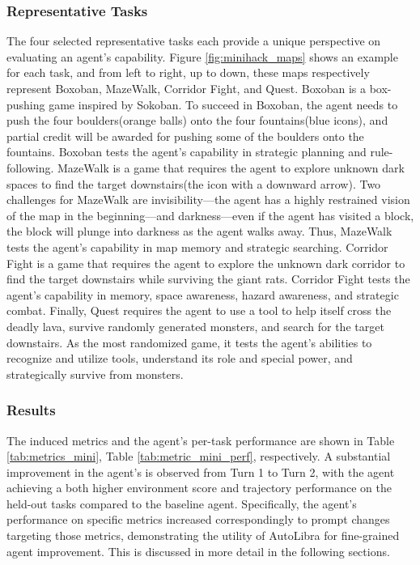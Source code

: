 \subsubsection{Representative Tasks}
The four selected representative tasks each provide a unique perspective on evaluating an agent's capability. Figure \ref{fig:minihack_maps} shows an example for each task, and from left to right, up to down, these maps respectively represent Boxoban, MazeWalk, Corridor Fight, and Quest. Boxoban is a box-pushing game inspired by Sokoban. To succeed in Boxoban, the agent needs to push the four boulders(orange balls) onto the four fountains(blue icons), and partial credit will be awarded for pushing some of the boulders onto the fountains. Boxoban tests the agent's capability in strategic planning and rule-following. MazeWalk is a game that requires the agent to explore unknown dark spaces to find the target downstairs(the icon with a downward arrow). Two challenges for MazeWalk are invisibility—the agent has a highly restrained vision of the map in the beginning—and darkness—even if the agent has visited a block, the block will plunge into darkness as the agent walks away. Thus, MazeWalk tests the agent's capability in map memory and strategic searching. Corridor Fight is a game that requires the agent to explore the unknown dark corridor to find the target downstairs while surviving the giant rats. Corridor Fight tests the agent's capability in memory, space awareness, hazard awareness, and strategic combat. Finally, Quest requires the agent to use a tool to help itself cross the deadly lava, survive randomly generated monsters, and search for the target downstairs. As the most randomized game, it tests the agent's abilities to recognize and utilize tools, understand its role and special power, and strategically survive from monsters.


\subsubsection{Results}

The induced metrics and the agent's per-task performance are shown in Table \ref{tab:metrics_mini}, Table \ref{tab:metric_mini_perf}, respectively. A substantial improvement in the agent's is observed from Turn 1 to Turn 2, with the agent achieving a both higher environment score and trajectory performance on the held-out tasks compared to the baseline agent. Specifically, the agent's performance on specific metrics increased correspondingly to prompt changes targeting those metrics, demonstrating the utility of AutoLibra for fine-grained agent improvement. This is discussed in more detail in the following sections.


